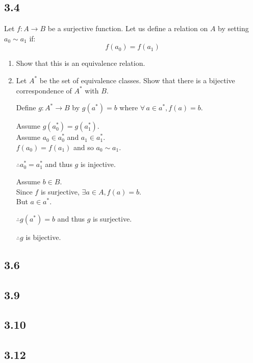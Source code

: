\documentclass[letterpaper,12pt,fleqn]{article}
\begin{document}
\subsection*{3.4}

Let $f:A\to B$ be a surjective function. Let us define a relation on $A$ by
setting $a_0\sim a_1$ if:
\[f(a_0)=f(a_1)\]
\begin{enumerate}[label=(\alph*)]
\item Show that this is an equivalence relation.

\item Let $A^*$ be the set of equivalence classes. Show that there is a
  bijective correspondence of $A^*$ with $B$.

  Define $g:A^*\to B$ by $g(a^*)=b$ where $\forall\,a\in a^*,f(a)=b$.

  Assume $g(a_0^*)=g(a_1^*)$. \\
  Assume $a_0\in a_0^*$ and $a_1\in a_1^*$. \\
  $f(a_0)=f(a_1)$ and so $a_0\sim a_1$.
  
  $\therefore a_0^*=a_1^*$ and thus $g$ is injective.

  Assume $b\in B$. \\
  Since $f$ is surjective, $\exists a\in A,f(a)=b$. \\
  But $a\in a^*$.

  $\therefore g(a^*)=b$ and thus $g$ is surjective.

  $\therefore g$ is bijective.
\end{enumerate}

\subsection*{3.6}

\subsection*{3.9}

\subsection*{3.10}

\subsection*{3.12}
\end{document}
